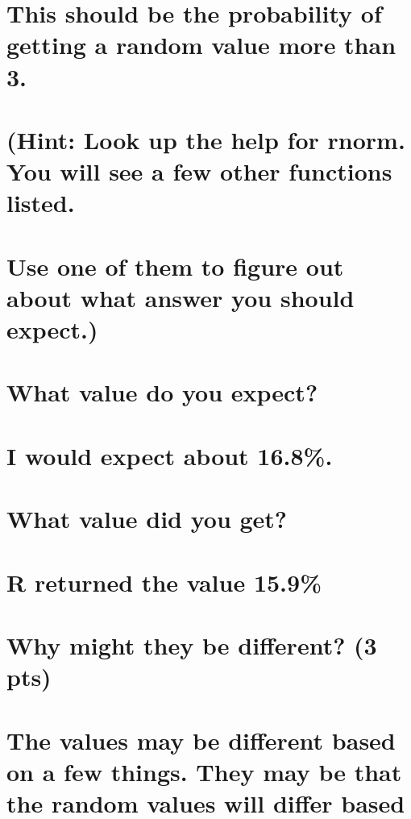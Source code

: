 \documentclass[]{article}
\begin{document}
\section{This should be the probability of getting a random value more
than
3.}\label{this-should-be-the-probability-of-getting-a-random-value-more-than-3.}

\section{(Hint: Look up the help for rnorm. You will see a few other
functions
listed.}\label{hint-look-up-the-help-for-rnorm.-you-will-see-a-few-other-functions-listed.}

\section{Use one of them to figure out about what answer you should
expect.)}\label{use-one-of-them-to-figure-out-about-what-answer-you-should-expect.}

\section{What value do you expect?}\label{what-value-do-you-expect}

\section{I would expect about 16.8\%.}\label{i-would-expect-about-16.8.}

\section{What value did you get?}\label{what-value-did-you-get}

\section{R returned the value 15.9\%}\label{r-returned-the-value-15.9}

\section{Why might they be different? (3
pts)}\label{why-might-they-be-different-3-pts}

\section{The values may be different based on a few things. They may be
that the random values will differ
based}\label{the-values-may-be-different-based-on-a-few-things.-they-may-be-that-the-random-values-will-differ-based}
\end{document}
